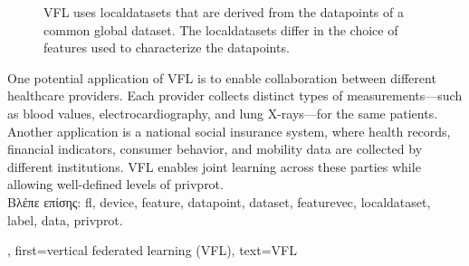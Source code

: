 {{\begin{figure}[H]
\begin{center}
			\end{center}
			\caption{VFL uses \gls{localdataset}s that are derived from the \gls{datapoint}s of a common global \gls{dataset}. 
				The \gls{localdataset}s differ in the choice of \gls{feature}s used to characterize the \gls{datapoint}s.\label{fig_vertical_FL_dict}}
		\end{figure}
		One potential application of VFL is to enable collaboration between 
		different healthcare providers. Each provider collects distinct types of measurements—such as blood 
		values, electrocardiography, and lung X-rays—for the same patients. Another application is a 
		national social insurance system, where health records, financial indicators, consumer behavior, 
		and mobility \gls{data} are collected by different institutions. VFL enables joint learning across 
		these parties while allowing well-defined levels of \gls{privprot}.
		\\
    		\foreignlanguage{greek}{Βλέπε επίσης:} \gls{fl}, \gls{device}, \gls{feature}, \gls{datapoint}, \gls{dataset}, \gls{featurevec}, 
		\gls{localdataset}, \gls{label}, \gls{data}, \gls{privprot}.},
	first={vertical federated learning (VFL)},
	text={VFL}
} 

